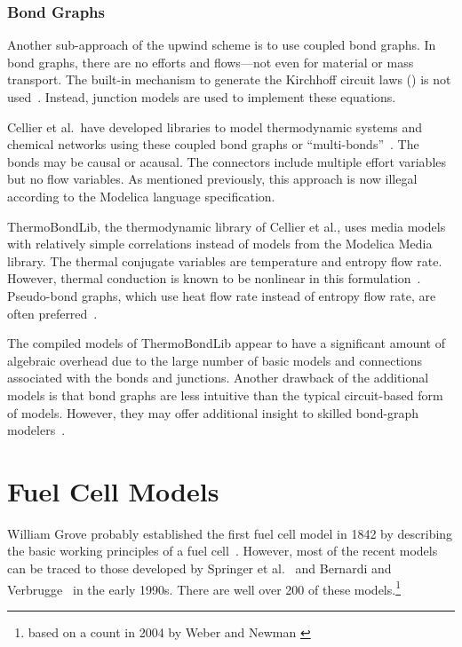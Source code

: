

\subsubsection{Bond Graphs}
\label{sec:BondGraphs}

Another sub-approach of the upwind scheme is to use coupled bond graphs.  In bond graphs, there are no efforts and flows---not even for material or mass transport.  The built-in mechanism to generate the Kirchhoff circuit laws () is not used~\cite{Broenink1999}.  Instead, junction models are used to implement these equations.

Cellier et al.\ have developed libraries to model thermodynamic systems and chemical networks using these coupled bond graphs or ``multi-bonds''~\cite{Cellier2008, Cellier2009, Greifeneder2012}.  The bonds may be causal or acausal.  The connectors include multiple effort variables but no flow variables.  As mentioned previously, this approach is now illegal according to the Modelica language specification.

ThermoBondLib, the thermodynamic library of Cellier et al., uses media models with relatively simple correlations instead of models from the Modelica Media library.  
The thermal conjugate variables are temperature and entropy flow rate.  However, thermal conduction is known to be nonlinear in this formulation~\cite{Hogan2006}.  Pseudo-bond graphs, which use heat flow rate instead of entropy flow rate, are often preferred~\cite{Bruun2009}.

The compiled models of ThermoBondLib appear to have a significant amount of algebraic overhead due to the large number of basic models and connections associated with the bonds and junctions.  Another drawback of the additional models is that bond graphs are less intuitive than the typical circuit-based form of  models.  However, they may offer additional insight to skilled bond-graph modelers~\cite{Zupancic2013}.



\section{Fuel Cell Models}
\label{sec:FCModels}

William Grove probably established the first fuel cell model in 1842 by describing the basic working principles of a fuel cell~\cite[pp.~3--4]{Chen2003}.  However, most of the recent  models can be traced to those developed by Springer et al.~\cite{Springer1991, Springer1993} and Bernardi and Verbrugge~\cite{Bernardi1991, Bernardi1992} in the early 1990s.  There are well over 200 of these models.\footnote{based on a count in 2004 by Weber and Newman \cite[p.~4681]{Weber2004ChemRev}}  

